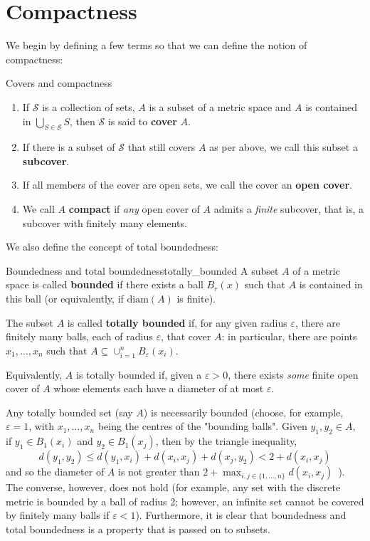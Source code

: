 \section{Compactness}

We begin by defining a few terms so that we can define the notion of compactness:

\begin{bdefin}{Covers and compactness}{}
\begin{enumerate}
    \item If $\mathcal{S}$ is a collection of sets, $A$ is a subset of a metric space and $A$ is contained in $\bigcup_{S \in \mathcal{S}} S $, then $\mathcal{S}$ is said to \textbf{cover} $A$.
    \item If there is a subset of $\mathcal{S}$ that still covers $A$ as per above, we call this subset a \textbf{subcover}.
    \item If all members of the cover are open sets, we call the cover an \textbf{open cover}.
    \item We call $A$ \textbf{compact} if \emph{any} open cover of $A$ admits a \emph{finite} subcover, that is, a subcover with finitely many elements.
\end{enumerate}
\end{bdefin}

We also define the concept of total boundedness:

\begin{bdefin}{Boundedness and total boundedness}{totally_bounded}
A subset $A$ of a metric space is called \textbf{bounded} if there exists a ball $B_{r}(x)$ such that $A$ is contained in this ball (or equivalently, if $\text{diam}(A)$ is finite). 
\newline

The subset $A$ is called \textbf{totally bounded} if, for any given radius $\varepsilon$, there are finitely many balls, each of radius $\varepsilon$, that cover $A$: in particular, there are points \mbox{$x_{1}, \ldots, x_{n}$} such that \mbox{$A \subseteq \cup_{i=1}^{n} B_{\varepsilon}(x_{i})$.}

Equivalently, $A$ is totally bounded if, given a $\varepsilon > 0$, there exists \emph{some} finite open cover of $A$ whose elements each have a diameter of at most $\varepsilon$.
\end{bdefin}
Any totally bounded set (say $A$) is necessarily bounded (choose, for example, $\varepsilon=1$, with $x_{1}, \ldots, x_{n}$ being the centres of the "bounding balls". Given $y_{1},y_{2}\in A$, if $y_{1}\in B_{1}(x_{i})$ and $y_{2}\in B_{1}(x_{j})$, then by the triangle inequality, \[ d(y_{1}, y_{2}) \leq d(y_{1},x_{i}) + d(x_{i}, x_{j}) + d(x_{j},y_{2}) < 2 + d(x_{i},x_{j}) \] and so the diameter of $A$ is not greater than $2 + \max_{ i,j\in \{1, \ldots, n \} } d(x_{i},x_{j})$\ ). The converse, however, does not hold (for example, any set with the discrete metric is bounded by a ball of radius 2; however, an infinite set cannot be covered by finitely many balls if $\varepsilon<1$). Furthermore, it is clear that boundedness and total boundedness is a property that is passed on to subsets.

